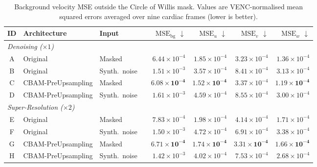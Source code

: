 \begin{table}[h!]
  \centering
  \caption{Background velocity MSE outside the Circle of Willis mask.  Values are VENC-normalised
  mean squared errors averaged over nine cardiac frames (lower is better).}
  \label{tab:background}
  \setlength{\tabcolsep}{4.5pt}
  \small
  \begin{tabular}{cll l rrrr}
    \toprule
    ID & Architecture & Input & &
      $\text{MSE}_{\text{bg}}$ $\downarrow$ &
      $\text{MSE}_{u}$ $\downarrow$ &
      $\text{MSE}_{v}$ $\downarrow$ &
      $\text{MSE}_{w}$ $\downarrow$ \\
    \midrule
    \multicolumn{8}{l}{\textit{Denoising ($\times 1$)}} \\
    \midrule
    A & Original           & Masked       & & $6.44{\times}10^{-4}$ & $1.85{\times}10^{-4}$ & $3.23{\times}10^{-4}$ & $1.36{\times}10^{-4}$ \\
    B & Original           & Synth.\ noise & & $1.51{\times}10^{-3}$ & $3.57{\times}10^{-4}$ & $8.41{\times}10^{-4}$ & $3.13{\times}10^{-4}$ \\
    C & CBAM-PreUpsampling & Masked       & & $\mathbf{6.08{\times}10^{-4}}$ & $\mathbf{1.52{\times}10^{-4}}$ & $3.37{\times}10^{-4}$ & $\mathbf{1.19{\times}10^{-4}}$ \\
    D & CBAM-PreUpsampling & Synth.\ noise & & $1.61{\times}10^{-3}$ & $4.59{\times}10^{-4}$ & $8.55{\times}10^{-4}$ & $3.00{\times}10^{-4}$ \\
    \midrule
    \multicolumn{8}{l}{\textit{Super-Resolution ($\times 2$)}} \\
    \midrule
    E & Original           & Masked       & & $7.83{\times}10^{-4}$ & $1.98{\times}10^{-4}$ & $4.14{\times}10^{-4}$ & $1.71{\times}10^{-4}$ \\
    F & Original           & Synth.\ noise & & $1.50{\times}10^{-3}$ & $4.72{\times}10^{-4}$ & $6.91{\times}10^{-4}$ & $3.38{\times}10^{-4}$ \\
    G & CBAM-PreUpsampling & Masked       & & $\mathbf{6.71{\times}10^{-4}}$ & $\mathbf{1.74{\times}10^{-4}}$ & $\mathbf{3.31{\times}10^{-4}}$ & $\mathbf{1.66{\times}10^{-4}}$ \\
    H & CBAM-PreUpsampling & Synth.\ noise & & $1.42{\times}10^{-3}$ & $4.02{\times}10^{-4}$ & $7.53{\times}10^{-4}$ & $2.68{\times}10^{-4}$ \\
    \bottomrule
  \end{tabular}
\end{table}

